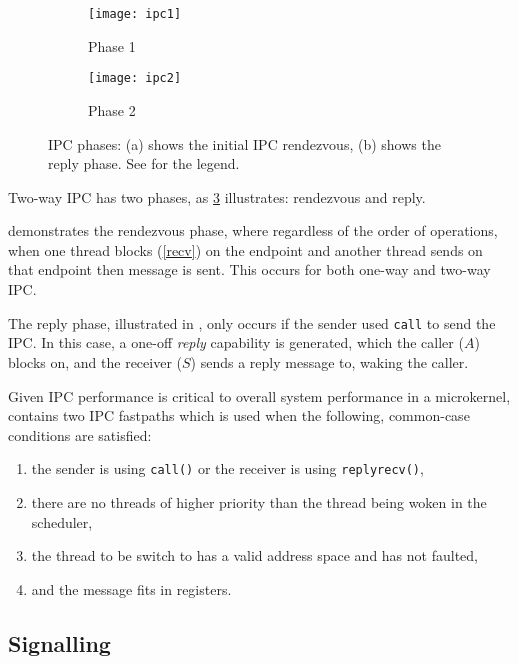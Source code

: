 \begin{figure}
    \centering
    \begin{subfigure}[b]{0.49\textwidth}
        \centering
        \texttt{[image: ipc1]}
        \caption{Phase 1}
        \label{f:ipc1}
    \end{subfigure}%
    \begin{subfigure}[b]{0.49\textwidth}
        \centering
        \texttt{[image: ipc2]}
        \caption{Phase 2}
        \label{f:ipc2}
    \end{subfigure}
    \label{f:ipc}
    \caption{IPC phases: (a) shows the initial IPC rendezvous, (b) shows the
    reply phase. See  for the legend.}
\end{figure}

Two-way IPC has two phases, as \cref{f:ipc} illustrates: rendezvous and reply.

 demonstrates the rendezvous phase, where regardless of the order of operations, 
when one thread blocks (\cref{recv}) on the endpoint and another thread sends on that endpoint
then message is sent. This occurs for both one-way and two-way \gls{IPC}.

The reply phase, illustrated in , only occurs if the sender used \texttt{call} to send
the \gls{IPC}. In this case, a one-off \emph{reply} capability is generated, which the caller ($A$)
blocks on, and the receiver ($S$) sends a reply message to, waking the caller. 

Given \gls{IPC} performance is critical to overall system performance in a microkernel, \selfour
contains two \gls{IPC} fastpaths which is used when the following, common-case conditions are satisfied:

\begin{enumerate}
    \item the sender is using \texttt{call()} or the receiver is using \texttt{replyrecv()},
    \item there are no threads of higher priority than the thread being woken in the scheduler,
    \item the thread to be switch to has a valid address space and has not faulted,
    \item and the message fits in registers.
\end{enumerate}



\subsection{Signalling}

